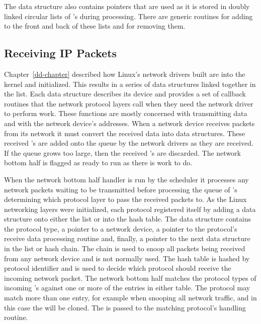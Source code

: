 The  data structure also contains pointers that are used as it is stored in doubly linked
circular lists of 's during processing.
There are generic  routines for adding  to the front and back of these lists
and for removing them.

\subsection{Receiving IP Packets}
Chapter~\ref{dd-chapter} described how Linux's network drivers built are into the kernel
and initialized.
This results in a series of  data structures linked together in the 
list.
Each  data structure describes its device and provides a set of callback routines
that the network protocol layers call when they need the network driver to perform work.
These functions are mostly concerned with transmitting data and with the network device's
addresses.
When a network device receives packets from its network it must convert the received 
data into  data structures.
These received 's are added onto the  queue
by the network drivers as they are received.
If the  queue grows too large, then the 
received 's are discarded.
The network bottom half is flagged as ready to run as there is work to do.

When the network bottom half handler is run by the scheduler it processes any network packets 
waiting to be transmitted
before processing the  queue of 's determining
which protocol layer to pass the received packets to.
As the Linux networking layers were initialized, each protocol registered itself by adding a 
 data structure onto either the  list or
into the  hash table.
The  data structure contains the protocol type, a pointer to a network device, a pointer
to the protocol's receive data processing routine and, finally, a pointer to the next
 data structure in the list or hash chain.
The  chain is used to snoop all packets being received from any network device
and is not normally used.
The  hash table is hashed by protocol identifier and is used to decide
which protocol should receive the incoming network packet.
The network bottom half matches the protocol types of incoming 's against 
one or more of the  entries in either table.
The protocol may match more than one entry, for example when snooping all network traffic, and
in this case the  will be cloned.
The  is passed to the matching protocol's handling routine.

